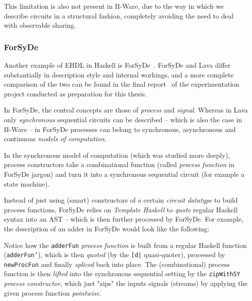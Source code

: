             \begin{center}
            \end{center}

            This limitation is also not present in Π-Ware, due to the way in which we describe circuits
            in a structural fashion, completely avoiding the need to deal with observable sharing.


            \subsubsection{ForSyDe}
            \label{subsubsec:forsyde}
            Another example of \ac{EHDL} in Haskell is ForSyDe~\cite{forsyde1999}.
            ForSyDe and Lava differ substantially in description style and internal workings,
            and a more complete comparison of the two can be found
            in the final report~\cite{functional-hardware-survey}
            of the experimentation project conducted as preparation for this thesis.

            In ForSyDe, the central concepts are those of \emph{process} and \emph{signal}.
            Whereas in Lava only \emph{synchronous} sequential circuits can be described – which is
            also the case in Π-Ware – in ForSyDe processes can belong to synchronous,
            asynchronous and continuous \emph{models of computation}.

            In the synchronous model of computation (which was studied more deeply),
            process constructors take a combinational function (called \emph{process function} in
            ForSyDe jargon) and turn it into a synchronous sequential circuit
            (for example a state machine).

            Instead of just using (smart) constructors of a certain \emph{circuit datatype} to build
            process functions, ForSyDe relies on \emph{Template Haskell} to
            \emph{quote} regular Haskell syntax into an \ac{AST} – which is then further processed by ForSyDe.
            For example, the description of an adder in ForSyDe would look like the following:

            \begin{center}
            \end{center}

            Notice how the \texttt{adderFun} \emph{process function} is built from a regular Haskell function
            (\texttt{adderFun'}), which is then \emph{quoted} (by the \texttt{[d|} quasi-quoter),
            processed by \texttt{newProcFun} and finally \emph{spliced} back into place.
            The (combinational) process function is then \emph{lifted} into the synchronous sequential setting
            by the \texttt{zipWithSY} \emph{process constructor},
            which just "zips" the inputs signals (streams) by applying the given process function \emph{pointwise}.

